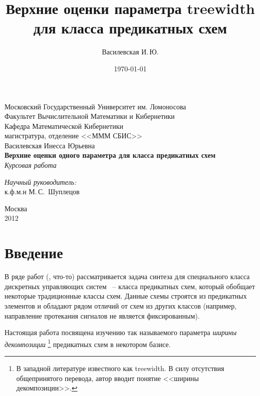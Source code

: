 \documentclass[12pt]{article}
\title{Верхние оценки параметра treewidth для класса предикатных схем}
\author{Василевская И.\,Ю.}
\date{\today}
\begin{document}
    \begin{titlepage}
        \begin{center}
            Московский Государственный Университет им. Ломоносова\\
            Факультет Вычислительной Математики и Кибернетики\\
            Кафедра Математической Кибернетики\\
            магистратура, отделение <<МММ СБИС>>\\[6cm]

            \large {Василевская Инесса Юрьевна}\\
            \LARGE \textbf {Верхние оценки одного параметра для класса предикатных схем}\\[0.8cm]
            \large \emph {Курсовая работа}\\[5.0cm]

            \begin{flushright}
                \large
                \begin{minipage}{0.40\textwidth}
                    \begin{flushleft}
                        \emph{Научный руководитель:}\\к.ф.м.н М.\,С.~Шуплецов
                    \end{flushleft}
                \end{minipage}
            \end{flushright}

            \vfill
            Москва\\
			2012
        \end{center}
    \end{titlepage}

\setcounter{page}{2}

\section{Введение}
В ряде работ (\cite{Shu09}, что-то) рассматривается задача синтеза для специального класса дискретных управляющих систем ~--
класса предикатных схем, который обобщает некоторые традиционные классы схем. Данные схемы строятся из предикатных элементов
и обладают рядом отличий от схем из других классов (например, направление протекания сигналов не является фиксированным).

Настоящая работа посвящена изучению так называемого параметра \textit{ширины декомпозиции} 
\footnote
{В западной литературе известного как treewidth. В силу отсутствия общепринятого перевода, автор вводит 
понятие <<ширины декомпозиции>>.} предикатных схем в некотором базисе.
\end{document}
